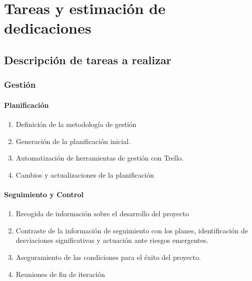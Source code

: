 \section{Tareas y estimación de dedicaciones}





\subsection{Descripción de tareas a realizar}

\subsubsection{Gestión}
\paragraph{Planificación}
\begin{enumerate}
    \item Definición de la metodología de gestión
    \item Generación de la planificación inicial.
    \item Automatización de herramientas de gestión con Trello.
    \item Cambios y actualizaciones de la planificación
\end{enumerate}
\paragraph{Seguimiento y Control}
\begin{enumerate}
    \item Recogida de información sobre el desarrollo del proyecto
    \item Contraste de la información de seguimiento con los planes, identificación de desviaciones significativas y actuación ante riesgos emergentes.
    \item Aseguramiento de las condiciones para el éxito del proyecto.
    \item Reuniones de fin de iteración
\end{enumerate}

